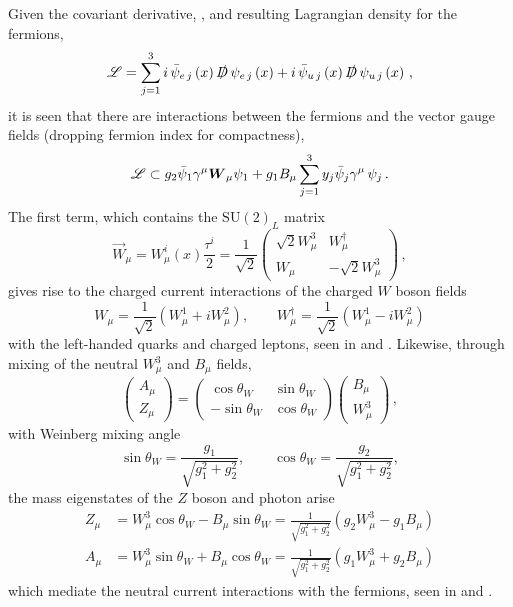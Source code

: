 Given the covariant derivative, , and resulting Lagrangian density for the fermions,
\[
 \mathscr{L} = \sum_{j=1}^{3} i \,\bar{\psi}_{e\,j}\left(x\right) \slashed{D} \,\psi_{e\,j}\left(x\right) + i \,\bar{\psi}_{u\,j}\left(x\right) \slashed{D} \,\psi_{u\,j}\left(x\right)\,,
\]
it is seen that there are interactions between the fermions and the vector gauge fields (dropping fermion index for compactness),
\[
 \mathscr{L} \subset g_{2} \bar{\psi}_{1} \gamma^{\mu}\boldsymbol{W}_{\mu} \psi_{1} + g_{1} B_{\mu} \sum_{j=1}^{3} y_{j}\bar{\psi}_{j} \gamma^{\mu} \,\psi_{j}\,.
\]
The first term, which contains the $\mathrm{SU}(2)_{L}$ matrix
\[
 \vec{W}_{\mu} = W_{\mu}^{i}(x) \frac{\tau^{i}}{2} = \frac{1}{\sqrt{2}} \begin{pmatrix}%
  \sqrt{2} W_{\mu}^{3} & W_{\mu}^{\dagger}     \\
  W_{\mu}              & -\sqrt{2} W_{\mu}^{3}
 \end{pmatrix}\,,
\]
gives rise to the charged current interactions of the charged $W$ boson fields
\[
 W_{\mu} = \frac{1}{\sqrt{2}} \left(W_{\mu}^{1}  + i W_{\mu}^{2}\right), \qquad W_{\mu}^{\dagger} = \frac{1}{\sqrt{2}} \left(W_{\mu}^{1}  - i W_{\mu}^{2}\right)
\]
with the left-handed quarks and charged leptons, seen in  and .
Likewise, through mixing of the neutral $W_{\mu}^{3}$ and $B_{\mu}$ fields,
\[
 \begin{pmatrix}
  A_{\mu} \\
  Z_{\mu}
 \end{pmatrix}
 = \begin{pmatrix}
  \cos\theta_{W}  & \sin\theta_{W} \\
  -\sin\theta_{W} & \cos\theta_{W}
 \end{pmatrix}
 \begin{pmatrix}
  B_{\mu} \\
  W_{\mu}^{3}
 \end{pmatrix}\,,
\]
with Weinberg mixing angle
\[
 \sin\theta_{W} = \frac{g_{1}}{\sqrt{g_{1}^{2} + g_{2}^{2}}}, \qquad \cos\theta_{W} = \frac{g_{2}}{\sqrt{g_{1}^{2} + g_{2}^{2}}},
\]
the mass eigenstates of the $Z$ boson and photon arise
\[
 \begin{split}
  Z_{\mu} &= W_{\mu}^{3} \cos\theta_{W} - B_{\mu} \sin\theta_{W} = \frac{1}{\sqrt{g_{1}^{2} + g_{2}^{2}}} \left(g_{2} W_{\mu}^{3} - g_{1} B_{\mu}\right) \\
  A_{\mu} &= W_{\mu}^3 \sin\theta_{W} + B_{\mu} \cos\theta_{W} = \frac{1}{\sqrt{g_{1}^{2} + g_{2}^{2}}} \left(g_{1} W_{\mu}^{3} + g_{2} B_{\mu}\right)
 \end{split}
\]
which mediate the neutral current interactions with the fermions, seen in  and .

